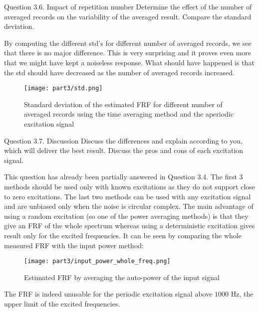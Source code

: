 \begin{Task}{Question 3.6. Impact of repetition number}
    Determine the effect of the number of averaged records on the variability of the averaged result. Compare the standard deviation.
\end{Task}

By computing the different std's for different number of averaged records, we see that there is no major difference. This is very surprising and it proves even more that we might have kept a noiseless response. What should have happened is that the std should have decreased as the number of averaged records increased.

\begin{figure}[H]
    \centering
    \texttt{[image: part3/std.png]}
    \caption{Standard deviation of the estimated FRF for different number of averaged records using the time averaging method and the aperiodic excitation signal}
\end{figure}

\begin{Task}{Question 3.7. Discussion}
    Discuss the differences and explain according to you, which will deliver the best result. Discuss the pros and cons of each excitation signal.
\end{Task}

This question has already been partially answered in Question 3.4. The first 3 methods should be used only with known excitations as they do not support close to zero excitations. The last two methods can be used with any excitation signal and are unbiased only when the noise is circular complex. The main advantage of using a random excitation (so one of the power averaging methods) is that they give an FRF of the whole spectrum whereas using a deterministic excitation gives result only for the excited frequencies. It can be seen by comparing the whole measured FRF with the input power method:\\

\begin{figure}[H]
    \centering
    \texttt{[image: part3/input\_power\_whole\_freq.png]}
    \caption{Estimated FRF by averaging the auto-power of the input signal}
\end{figure}

The FRF is indeed unusable for the periodic excitation signal above $1000$ Hz, the upper limit of the excited frequencies.\\

